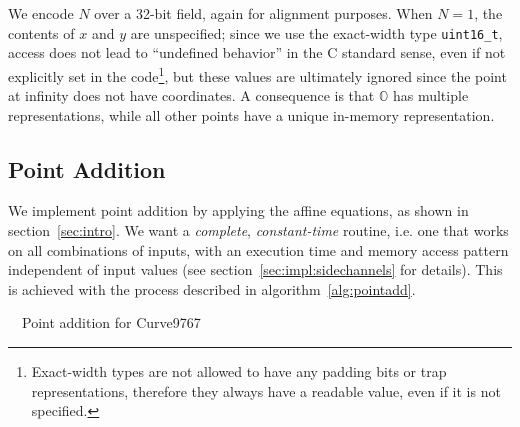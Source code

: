 \documentclass{llncs}
\newcommand{\neutral}{\mathbb{O}}
\begin{document}
We encode $N$ over a 32-bit field, again for alignment purposes. When
$N = 1$, the contents of $x$ and $y$ are unspecified; since we use the
exact-width type \verb+uint16_t+, access does not lead to ``undefined
behavior'' in the C standard sense, even if not explicitly set in the
code\footnote{Exact-width types are not allowed to have any padding bits
or trap representations, therefore they always have a readable value,
even if it is not specified.}, but these values are ultimately ignored
since the point at infinity does not have coordinates. A consequence is
that $\neutral$ has multiple representations, while all other points
have a unique in-memory representation.

\subsection{Point Addition}

We implement point addition by applying the affine equations, as shown
in section~\ref{sec:intro}. We want a \emph{complete},
\emph{constant-time} routine, i.e. one that works on all combinations of
inputs, with an execution time and memory access pattern independent of
input values (see section~\ref{sec:impl:sidechannels} for details). This
is achieved with the process described in algorithm~\ref{alg:pointadd}.

\begin{algorithm}[H]
    \caption{\ \ Point addition for Curve9767}\label{alg:pointadd}
    \begin{algorithmic}[1]
    \end{algorithmic}
\end{algorithm}
\end{document}
